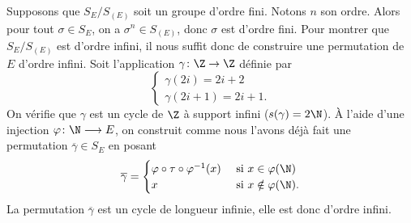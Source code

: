 \begin{enumerate}
    Supposons que $S_E/S_{(E)}$ soit un groupe d'ordre fini.
    Notons $n$ son ordre.
    Alors pour tout $\sigma\in S_E$, on a $\sigma^n\in S_{(E)}$, donc $\sigma$ est d'ordre fini.
    Pour montrer que $S_E/S_{(E)}$ est d'ordre infini, il nous suffit donc de construire une permutation de $E$ d'ordre infini.
    Soit l'application $\gamma\colon\Z\to\Z$ définie par
    \[
      \begin{cases}
        \gamma(2i) = 2i + 2 \\
        \gamma(2i + 1) = 2i + 1.
      \end{cases}
    \]
    On vérifie que $\gamma$ est un cycle de $\Z$ à support infini ($s(\gamma) = 2\N$). 
    À l'aide d'une injection $\varphi\colon\N\longrightarrow E$, on construit comme nous l'avons déjà fait une permutation $\overline{\gamma}\in S_E$ en posant
    \[
      \overline{\gamma} =
      \begin{cases}
        \varphi\circ\tau\circ\varphi^{-1}(x) & \text{ si } x\in\varphi(\N)\\
        x                           & \text{ si } x\notin\varphi(\N).
      \end{cases}
    \]
    La permutation $\overline{\gamma}$ est un cycle de longueur infinie, elle est donc d'ordre infini.
\end{enumerate}

